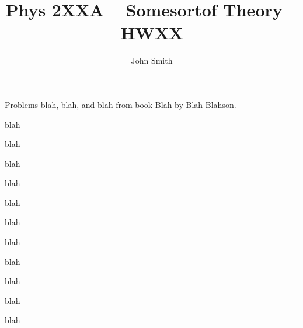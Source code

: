 \usepackage[margin=1in]{geometry} %




\title{Phys 2XXA -- Somesortof Theory -- HWXX}
\author{John Smith}
\date{} %



\maketitle



\begin{em}
Problems blah, blah, and blah from book Blah by Blah Blahson.
\end{em}




\sectionproblem%
\begin{em}
blah
\end{em}


\begin{enumproblem}

\item \begin{em}
blah
\end{em}

blah


\item \begin{em}
blah
\end{em}

blah


\item \begin{em}
blah
\end{em}

blah


\item \begin{em}
blah
\end{em}

blah


\item \begin{em}
blah
\end{em}

blah


\end{enumproblem}




